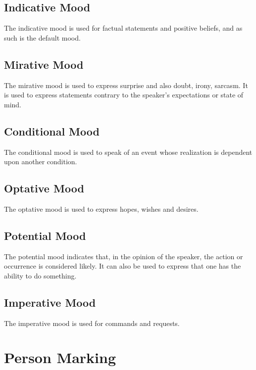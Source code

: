 \documentclass[grammar]{subfiles}
\begin{document}
\subsection{Indicative Mood}
\label{ssec:vp_indicative}

The indicative mood is used for factual statements and positive beliefs,
and as such is the default mood.  


\subsection{Mirative Mood}
\label{ssec:vp_mirative}

The mirative mood is used to express surprise and also doubt, irony,
sarcasm.  It is used to express statements contrary to the speaker’s
expectations or state of mind.


\subsection{Conditional Mood}
\label{ssec:vp_conditional}

The conditional mood is used to speak of an event whose realization is
dependent upon another condition. 


\subsection{Optative Mood}
\label{ssec:vp_optative}

The optative mood is used to express hopes, wishes and desires.


\subsection{Potential Mood}
\label{ssec:vp_potential}

The potential mood indicates that, in the opinion of the speaker, the
action or occurrence is considered likely.  It can also be used to express that
one has the ability to do something.


\subsection{Imperative Mood}
\label{ssec:vp_imperative}

The imperative mood is used for commands and requests. 

\section{Person Marking}
\label{sec:vm_person_marking}
\end{document}
